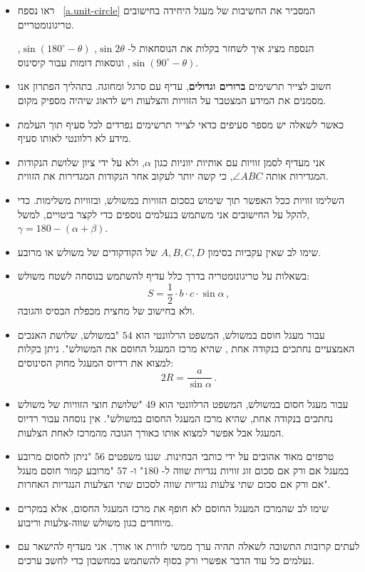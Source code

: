 \begin{itemize}

\item
ראו נספח~%
\ref{a.unit-circle}
המסביר את החשיבות של מעגל היחידה בחישובים טריגונומטריים.

הנספח מציג איך לשחזר בקלות את הנוסחאות ל-%
$\sin 2\theta$, $\sin (180^\circ-\theta)$, $\sin (90^\circ-\theta)$,
ונוסאות דומות עבור קיסינוס.

\item
חשוב לצייר תרשימים 
\textbf{ברורים וגדולים},
עדיף עם סרגל ומחוגה. בתהליך הפתרון אנו מסמנים את המידע המצטבר על הזוויות והצלעות ויש לדאוג שיהיה מספיק מקום.

\item
כאשר לשאלה יש מספר סעיפים כדאי לצייר תרשימים נפרדים לכל סעיף תוך העלמת מידע לא רלוונטי לאותו סעיף.

\item
אני מעדיף לסמן זוויות עם אותיות יווניות כגון
$\alpha$,
ולא על ידי ציון שלושת הנקודות המגדירות אותה
$\angle ABC$,
כי קשה יותר לעקוב אחר הנקודות המגדירות את הזווית.

\item
השלימו זוויות ככל האפשר תוך שימוש בסכום הזוויות במשולש, ובזוויות משלימות. כדי להקל על החישובים אני משתמש בנעלמים נוספים כדי לקצר ביטויים, למשל,
$\gamma=180-(\alpha+\beta)$.

\item
שימו לב שאין עקביות בסימון 
$A,B,C,D$
של הקודקודים של משולש או מרובע.


\item 
בשאלות על טריגונומטריה בדרך כלל עדיף להשתמש בנוסחה לשטח משולש:
\[
S=\frac{1}{2}\cdot b \cdot c \cdot\sin \alpha\,,
\]
ולא בחישוב של מחצית מכפלת הבסיס והגובה.

\item
עבור מעגל חוסם במשולש, המשפט הרלוונטי הוא
$54$
"במשולש, שלושת האנכים האמצעיים נחתכים בנקודה אחת , שהיא מרכז המעגל החוסם את המשולש". ניתן בקלות למצוא את רדיוס המעגל מחוק הסינוסים:
\[
2R=\frac{a}{\sin\alpha}\,.
\]
\vspace{-4ex}
\item
עבור מעגל חסום במשולש, המשפט הרלוונטי הוא
$49$
"שלושת חוצי הזוויות של משולש נחתכים בנקודה אחת, שהיא מרכז המעגל החסום במשולש". אין נוסחה עבור רדיוס המעגל אבל אפשר למצוא אותו כאורך הגובה מהמרכז לאחת הצלעות.


\item 
טרפזים מאוד אהובים על ידי כותבי הבחינות. שננו משפטים
$56$
"ניתן לחסום מרובע במעגל אם ורק אם סכום זוג זוויות נגדיות שווה ל-%
$180$"
ו-%
$57$
"מרובע קמור חוסם מעגל אם ורק אם סכום שתי צלעות נגדיות שווה לסכום שתי הצלעות הנגדיות האחרות".

\item
שימו לב שהמרכז המעגל החוסם לא חופף את מרכז המעגל החסום, אלא במקרים מיוחדים כגון משולש שווה-צלעות וריבוע.


\item
לעתים קרובות התשובה לשאלה תהיה ערך ממשי לזווית או אורך. אני מעדיף להישאר עם נעלמים כל עוד הדבר אפשרי ורק בסוף להשתמש במחשבון כדי לחשב ערכים.


\end{itemize}

\npchap
